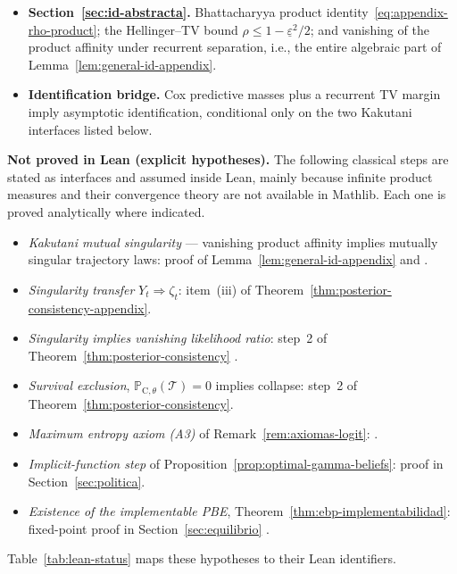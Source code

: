 \documentclass[12pt]{article}
\numberwithin{equation}{section}
\numberwithin{table}{section}
\theoremstyle{definition}
\newcommand{\ProbC}[1]{\mathbb{P}_{\mathrm{C},#1}}
\begin{document}
\begin{itemize}
  margins; and the Bayes factorization of step~2 of
  Theorem~\ref{thm:posterior-consistency}: the bound
  $\mu_t(\theta)\le(\mu_0(\theta)/\mu_0(\theta^\ast))\,R_t^\theta$ forces
  $\mu_t(\theta)\to 0$ whenever $R_t^\theta\to 0$.
  \item \textbf{Section~\ref{sec:id-abstracta}.}
  Bhattacharyya product identity~\eqref{eq:appendix-rho-product}; the
  Hellinger--TV bound $\rho\le 1-\underline\varepsilon^2/2$; and vanishing of
  the product affinity under recurrent separation, i.e., the entire algebraic
  part of Lemma~\ref{lem:general-id-appendix}.
  \item \textbf{Identification bridge.}
  Cox predictive masses plus a recurrent TV margin imply asymptotic
  identification, conditional only on the two Kakutani interfaces listed
  below.
\end{itemize}

\medskip
\noindent\textbf{Not proved in Lean (explicit hypotheses).}
The following classical steps are stated as interfaces and assumed inside
Lean, mainly because infinite product measures and their convergence theory
are not available in Mathlib. Each one is proved analytically where indicated.
\begin{itemize}
  \item \emph{Kakutani mutual singularity} --- vanishing product affinity
  implies mutually singular trajectory laws: proof of
  Lemma~\ref{lem:general-id-appendix} and \citet{Kakutani1948}.
  \item \emph{Singularity transfer} $Y_t\Rightarrow\zeta_t$: item~(iii) of
  Theorem~\ref{thm:posterior-consistency-appendix}.
  \item \emph{Singularity implies vanishing likelihood ratio}: step~2 of
  Theorem~\ref{thm:posterior-consistency}
  \citep{BlackwellDubins1962,Schervish1995Theory}.
  \item \emph{Survival exclusion}, $\ProbC{\theta}(\mathcal{T})=0$ implies
  collapse: step~2 of Theorem~\ref{thm:posterior-consistency}.
  \item \emph{Maximum entropy axiom (A3)} of Remark~\ref{rem:axiomas-logit}:
  \citet{Jaynes1957Information}.
  \item \emph{Implicit-function step} of
  Proposition~\ref{prop:optimal-gamma-beliefs}: proof in
  Section~\ref{sec:politica}.
  \item \emph{Existence of the implementable PBE},
  Theorem~\ref{thm:ebp-implementabilidad}: fixed-point proof in
  Section~\ref{sec:equilibrio} \citep{Kakutani1941}.
\end{itemize}
Table~\ref{tab:lean-status} maps these hypotheses to their Lean identifiers.
\end{document}
